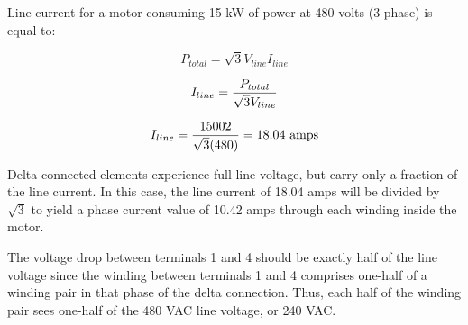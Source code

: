 \vskip 10pt

Line current for a motor consuming 15 kW of power at 480 volts (3-phase) is equal to:

$$P_{total} = \sqrt{3} V_{line} I_{line}$$

$$I_{line} = {P_{total} \over \sqrt{3} V_{line}}$$

$$I_{line} = {15002 \over \sqrt{3} (480)} = 18.04 \hbox{ amps}$$

Delta-connected elements experience full line voltage, but carry only a fraction of the line current.  In this case, the line current of 18.04 amps will be divided by $\sqrt{3}$ to yield a phase current value of 10.42 amps through each winding inside the motor.

\vskip 10pt

The voltage drop between terminals 1 and 4 should be exactly half of the line voltage since the winding between terminals 1 and 4 comprises one-half of a winding pair in that phase of the delta connection.  Thus, each half of the winding pair sees one-half of the 480 VAC line voltage, or 240 VAC.




